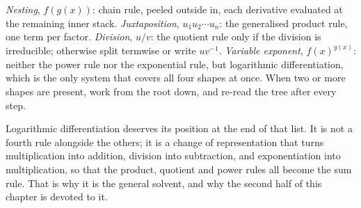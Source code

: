 \begin{keynote}
\emph{Nesting}, $f(g(x))$: chain rule, peeled outside in, each derivative evaluated at the remaining inner stack. \emph{Juxtaposition}, $u_{1}u_{2}\cdots u_{n}$: the generalised product rule, one term per factor. \emph{Division}, $u/v$: the quotient rule only if the division is irreducible; otherwise split termwise or write $uv^{-1}$. \emph{Variable exponent}, $f(x)^{g(x)}$: neither the power rule nor the exponential rule, but logarithmic differentiation, which is the only system that covers all four shapes at once. When two or more shapes are present, work from the root down, and re-read the tree after every step.
\end{keynote}

Logarithmic differentiation deserves its position at the end of that list. It is not a fourth rule alongside the others; it is a change of representation that turns multiplication into addition, division into subtraction, and exponentiation into multiplication, so that the product, quotient and power rules all become the sum rule. That is why it is the general solvent, and why the second half of this chapter is devoted to it.

\begin{center}
\end{center}

